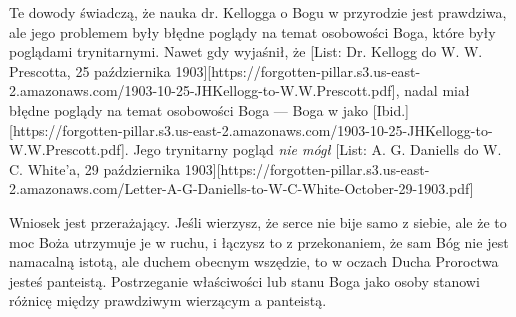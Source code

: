 Te dowody świadczą, że nauka dr. Kellogga o Bogu w przyrodzie jest prawdziwa, ale jego problemem były błędne poglądy na temat osobowości Boga, które były poglądami trynitarnymi. Nawet gdy wyjaśnił, że [List: Dr. Kellogg do W. W. Prescotta, 25 października 1903][https://forgotten-pillar.s3.us-east-2.amazonaws.com/1903-10-25-JHKellogg-to-W.W.Prescott.pdf], nadal miał błędne poglądy na temat osobowości Boga — Boga w  jako [Ibid.][https://forgotten-pillar.s3.us-east-2.amazonaws.com/1903-10-25-JHKellogg-to-W.W.Prescott.pdf]. Jego trynitarny pogląd \textit{nie mógł} [List: A. G. Daniells do W. C. White’a, 29 października 1903][https://forgotten-pillar.s3.us-east-2.amazonaws.com/Letter-A-G-Daniells-to-W-C-White-October-29-1903.pdf]

Wniosek jest przerażający. Jeśli wierzysz, że serce nie bije samo z siebie, ale że to moc Boża utrzymuje je w ruchu, i łączysz to z przekonaniem, że sam Bóg nie jest namacalną istotą, ale duchem obecnym wszędzie, to w oczach Ducha Proroctwa jesteś panteistą. Postrzeganie właściwości lub stanu Boga jako osoby stanowi różnicę między prawdziwym wierzącym a panteistą.


